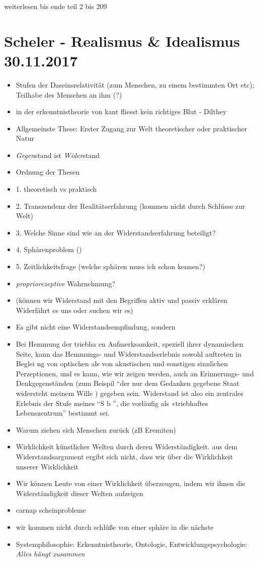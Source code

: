 \documentclass[emulatestandardclasses]{scrartcl}
\begin{document}
weiterlesen bis ende teil 2 bis 209

\section{Scheler - Realismus \& Idealismus\\30.11.2017}

\begin{itemize}
  \item Stufen der Daseinsrelativität (zum Menschen, zu einem bestimmten Ort etc); Teilhabe des Menschen an ihm (?)
  \item in der erkenntnistheorie von kant fliesst kein richtiges Blut - Dilthey
  \item Allgemeinste These: Erster Zugang zur Welt theoretischer oder praktischer Natur 
  \item \emph{Gegen}stand ist \emph{Wider}stand
  \item Ordnung der Thesen
  \item 1. theoretisch vs praktisch
  \item 2. Transzendenz der Realitätserfahrung (kommen nicht durch Schlüsse zur Welt)
  \item 3. Welche Sinne sind wie an der Widerstandserfahrung beteiligt?
  \item 4. Sphärenproblem ()
  \item 5. Zeitlichkeitsfrage (welche sphären muss ich schon kennen?)
  \item \emph{propriorezeptive} Wahrnehmung?
  \item (können wir Widerstand mit den Begriffen aktiv und passiv erklären Widerfährt es uns oder suchen wir es)
  \item 
  
  Es gibt nicht eine Widerstandsempfindung, sondern 
  \item Bei Hemmung der triebha en Aufmerksamkeit, speziell ihrer dynamischen Seite, kann das Hemmungs- und Widerstandserlebnis sowohl auftreten in Beglei ng von optischen als von akustischen und sonstigen sinnlichen Perzeptionen, und
es kann, wie wir zeigen werden, auch an Erinnerungs- und Denkgegenständen (zum Beispil "`der nur dem Gedanken gegebene Staat widersteht meinem Wille ) gegeben sein. Widerstand ist also ein zentrales Erlebnis der Stufe meines "`S b "', die vorläufig als «triebhaftes Lebenszentrum"' bestimmt sei.
\item Warum ziehen sich Menschen zurück (zB Eremiten)
\item Wirklichkeit künstlicher Welten durch deren Widerständigkeit. aus dem Widerstandsargument ergibt sich nicht, dass wir über die Wirklichkeit unserer Wirklichkeit
\item Wir können Leute von einer Wirklichkeit überzeugen, indem wir ihnen die Widerständigkeit dieser Welten aufzeigen
\item carnap scheinprobleme
\item wir kommen nicht durch schlüße von einer sphäre in die nächste
\item Systemphilosophie: Erkenntnistheorie, Ontologie, Entwicklungspsychologie: \emph{Alles hängt zusammen}
\end{itemize}
\end{document}
